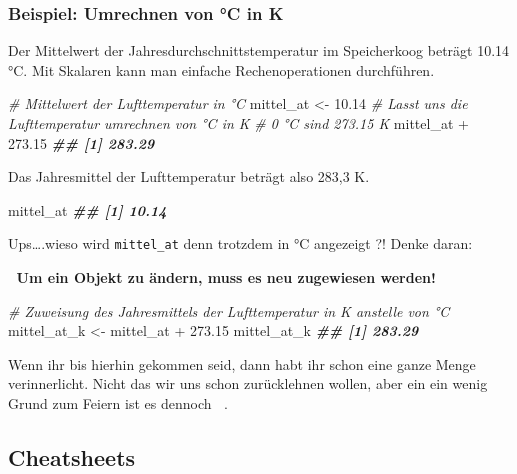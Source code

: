 \documentclass[
]{article}
\newenvironment{Shaded}{\begin{snugshade}}{\end{snugshade}}
\newcommand{\CommentTok}[1]{\textcolor[rgb]{0.56,0.35,0.01}{\textit{#1}}}
\newcommand{\DocumentationTok}[1]{\textcolor[rgb]{0.56,0.35,0.01}{\textbf{\textit{#1}}}}
\newcommand{\FloatTok}[1]{\textcolor[rgb]{0.00,0.00,0.81}{#1}}
\newcommand{\NormalTok}[1]{#1}
\newcommand{\OtherTok}[1]{\textcolor[rgb]{0.56,0.35,0.01}{#1}}
\newcommand{\SpecialCharTok}[1]{\textcolor[rgb]{0.00,0.00,0.00}{#1}}
\begin{document}
\hypertarget{beispiel-umrechnen-von-c-in-k}{%
\subsubsection{Beispiel: Umrechnen von °C in K}\label{beispiel-umrechnen-von-c-in-k}}

Der Mittelwert der Jahresdurchschnittstemperatur im Speicherkoog beträgt 10.14 °C. Mit Skalaren kann man einfache Rechenoperationen durchführen.

\begin{Shaded}
\begin{Highlighting}[]
\CommentTok{\# Mittelwert der Lufttemperatur in °C}
\NormalTok{mittel\_at }\OtherTok{\textless{}{-}} \FloatTok{10.14}
\CommentTok{\# Lasst uns die Lufttemperatur umrechnen von °C in K}
\CommentTok{\# 0 °C sind 273.15 K}
\NormalTok{mittel\_at }\SpecialCharTok{+} \FloatTok{273.15}
\DocumentationTok{\#\# [1] 283.29}
\end{Highlighting}
\end{Shaded}

Das Jahresmittel der Lufttemperatur beträgt also 283,3 K.

\begin{Shaded}
\begin{Highlighting}[]
\NormalTok{mittel\_at}
\DocumentationTok{\#\# [1] 10.14}
\end{Highlighting}
\end{Shaded}

Ups\ldots.wieso wird \texttt{mittel\_at} denn trotzdem in °C angezeigt ?! Denke daran:

🚨 \textbf{Um ein Objekt zu ändern, muss es neu zugewiesen werden!}

\begin{Shaded}
\begin{Highlighting}[]
\CommentTok{\# Zuweisung des Jahresmittels der Lufttemperatur in K anstelle von °C}
\NormalTok{mittel\_at\_k }\OtherTok{\textless{}{-}}\NormalTok{ mittel\_at }\SpecialCharTok{+} \FloatTok{273.15}
\NormalTok{mittel\_at\_k}
\DocumentationTok{\#\# [1] 283.29}
\end{Highlighting}
\end{Shaded}

Wenn ihr bis hierhin gekommen seid, dann habt ihr schon eine ganze Menge verinnerlicht. Nicht das wir uns schon zurücklehnen wollen, aber ein ein wenig Grund zum Feiern ist es dennoch 🎉🍻.

\hypertarget{cheatsheets}{%
\subsection{Cheatsheets}\label{cheatsheets}}
\end{document}
